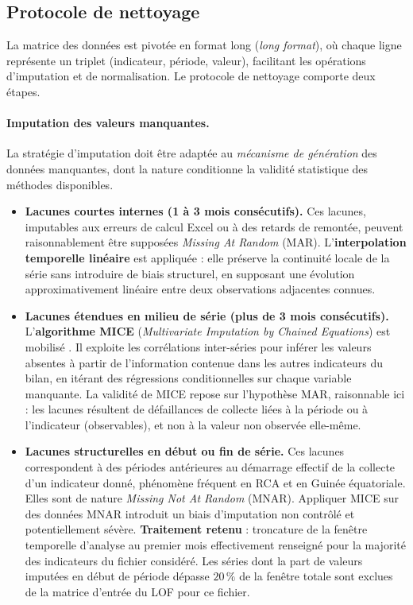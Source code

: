 \documentclass[12pt, a4paper]{article}
\begin{document}
\subsection{Protocole de nettoyage}
\label{subsec:protocole}

La matrice des données est pivotée en format long (\textit{long format}),
où chaque ligne représente un triplet (indicateur, période, valeur),
facilitant les opérations d'imputation et de normalisation.
Le protocole de nettoyage comporte deux étapes.

\paragraph{Imputation des valeurs manquantes.}

La stratégie d'imputation doit être adaptée au \textit{mécanisme de
génération} des données manquantes, dont la nature conditionne la validité
statistique des méthodes disponibles.

\begin{itemize}
    \item \textbf{Lacunes courtes internes (1 à 3 mois consécutifs).}
    Ces lacunes, imputables aux erreurs de calcul Excel ou à des retards
    de remontée, peuvent raisonnablement être supposées
    \textit{Missing At Random} (MAR). L'\textbf{interpolation temporelle
    linéaire} est appliquée : elle préserve la continuité locale de la
    série sans introduire de biais structurel, en supposant une évolution
    approximativement linéaire entre deux observations adjacentes connues.

    \item \textbf{Lacunes étendues en milieu de série (plus de 3 mois
    consécutifs).}
    L'\textbf{algorithme MICE} (\textit{Multivariate Imputation by Chained
    Equations}) est mobilisé \cite{vanbuuren2011mice}. Il exploite les
    corrélations inter-séries pour inférer les valeurs absentes à partir de
    l'information contenue dans les autres indicateurs du bilan, en itérant
    des régressions conditionnelles sur chaque variable manquante. La validité
    de MICE repose sur l'hypothèse MAR, raisonnable ici : les lacunes
    résultent de défaillances de collecte liées à la période ou à
    l'indicateur (observables), et non à la valeur non observée elle-même.

    \item \textbf{Lacunes structurelles en début ou fin de série.}
    Ces lacunes correspondent à des périodes antérieures au démarrage
    effectif de la collecte d'un indicateur donné, phénomène fréquent en
    RCA et en Guinée équatoriale. Elles sont de nature
    \textit{Missing Not At Random} (MNAR). Appliquer MICE sur des données
    MNAR introduit un biais d'imputation non contrôlé et potentiellement
    sévère.
    \textbf{Traitement retenu} : troncature de la fenêtre temporelle
    d'analyse au premier mois effectivement renseigné pour la majorité des
    indicateurs du fichier considéré. Les séries dont la part de valeurs
    imputées en début de période dépasse $20\,\%$ de la fenêtre totale sont
    exclues de la matrice d'entrée du LOF pour ce fichier.
\end{itemize}
\end{document}

